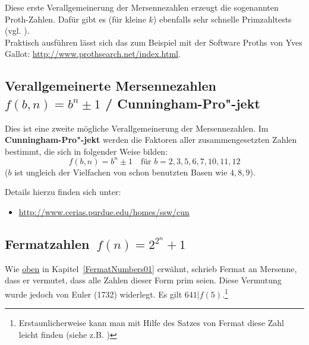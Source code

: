 \begin{refsegment}
    Diese erste Verallgemeinerung der
    Mersennezahlen
    erzeugt die sogenannten Proth-Zahlen.
    Dafür gibt es (für kleine $k$)
    ebenfalls sehr schnelle Primzahltests (vgl. \cite{Knuth1998}).\\
    Praktisch ausführen lässt sich das zum Beispiel mit der Software
    Proths von Yves Gallot:
  \url{http://www.prothsearch.net/index.html}.


\hypertarget{generalizedMersennenumbers}{}
\subsection
    [Verallgemeinerte Mersennezahlen \texorpdfstring{$ f(b,n) = b^n \pm 1$}{ f(b,n) = b\^{}n +- 1} / Cunningham-Projekt]
    {Verallgemeinerte Mersennezahlen
    $ f(b,n) = b^n \pm 1$ / Cunningham-Pro"-jekt}

    Dies ist eine zweite mögliche Verallgemeinerung der
    Mersennezahlen.
    Im  \textbf{Cunningham-Pro"-jekt} werden die
    Faktoren aller zusammengesetzten Zahlen bestimmt, die sich in folgender
    Weise bilden:
    $$ f(b,n) = b^n \pm 1  \quad \mbox{für } b = 2, 3, 5, 6, 7, 10, 11, 12 $$
    ($b$ ist ungleich der Vielfachen von schon benutzten Basen wie $4, 8, 9$).

    Details hierzu finden sich unter:
\vspace{-10pt}
\begin{itemize}
  \item[] {\url{http://www.cerias.purdue.edu/homes/ssw/cun}}
\end{itemize}


\hypertarget{FermatNumbers02}{}
\subsection[Fermatzahlen \texorpdfstring{$f(n) = 2^{2^n} + 1$}{f(n) = 2\^{}{2\^{}n} + 1}]
              {Fermatzahlen\footnotemark~$f(n) = 2^{2^n} + 1$}
    \label{L-FermatNumbers02}
     
    Wie \hyperlink{FermatNumbers01}{oben} in Kapitel~\ref{FermatNumbers01}
    erwähnt, schrieb Fermat an
    Mersenne, dass er vermutet, dass alle Zahlen dieser Form prim seien.
    Diese Vermutung wurde jedoch von Euler (1732) widerlegt.
    Es gilt $641 | f(5)$.\footnote{%
    Erstaunlicherweise kann man mit Hilfe des Satzes von Fermat diese Zahl leicht
    finden (siehe z.B. \cite[S. 176]{Scheid2006}) %
    }


\end{refsegment}
